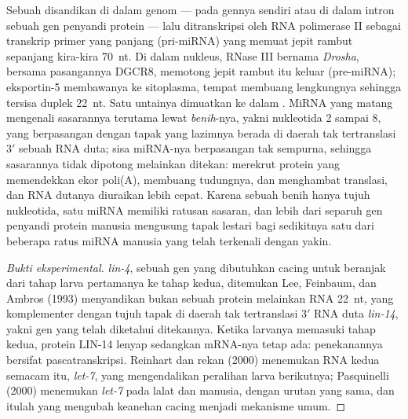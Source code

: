 \begin{definition}[MikroRNA]\label{def:b3:rna-regulation:mirna}
Sebuah \emph{} disandikan di dalam genom --- pada gennya sendiri atau
di dalam intron sebuah gen penyandi protein --- lalu ditranskripsi oleh RNA
polimerase II sebagai transkrip primer yang panjang (pri-miRNA) yang memuat
jepit rambut sepanjang kira-kira \qty{70}{nt}. Di dalam nukleus, RNase III
bernama \emph{Drosha}, bersama pasangannya DGCR8, memotong jepit rambut itu
keluar (pre-miRNA); eksportin-5 membawanya ke sitoplasma, tempat 
membuang lengkungnya sehingga tersisa duplek \qty{22}{nt}. Satu untainya
dimuatkan ke dalam . MiRNA yang matang mengenali sasarannya terutama
lewat \emph{benih}-nya, yakni nukleotida 2 sampai 8, yang berpasangan dengan
tapak yang lazimnya berada di daerah tak tertranslasi 3$'$ sebuah RNA duta;
sisa miRNA-nya berpasangan tak sempurna, sehingga sasarannya tidak dipotong
melainkan ditekan:  merekrut protein yang memendekkan ekor poli(A),
membuang tudungnya, dan menghambat translasi, dan RNA dutanya diuraikan lebih
cepat. Karena sebuah benih hanya tujuh nukleotida, satu miRNA memiliki ratusan
sasaran, dan lebih dari separuh gen penyandi protein manusia mengusung tapak
lestari bagi sedikitnya satu dari beberapa ratus miRNA manusia yang telah
terkenali dengan yakin.
\end{definition}

\begin{proof}[Bukti eksperimental]
\emph{lin-4}, sebuah gen yang dibutuhkan cacing untuk beranjak dari tahap
larva pertamanya ke tahap kedua, ditemukan Lee, Feinbaum, dan Ambros (1993)
menyandikan bukan sebuah protein melainkan RNA \qty{22}{nt}, yang komplementer
dengan tujuh tapak di daerah tak tertranslasi 3$'$ RNA duta \emph{lin-14},
yakni gen yang telah diketahui ditekannya. Ketika larvanya memasuki tahap
kedua, protein LIN-14 lenyap sedangkan mRNA-nya tetap ada: penekanannya
bersifat pascatranskripsi. Reinhart dan rekan (2000) menemukan RNA kedua
semacam itu, \emph{let-7}, yang mengendalikan peralihan larva berikutnya;
Pasquinelli (2000) menemukan \emph{let-7} pada lalat dan manusia, dengan
urutan yang sama, dan itulah yang mengubah keanehan cacing menjadi mekanisme
umum.
\end{proof}

